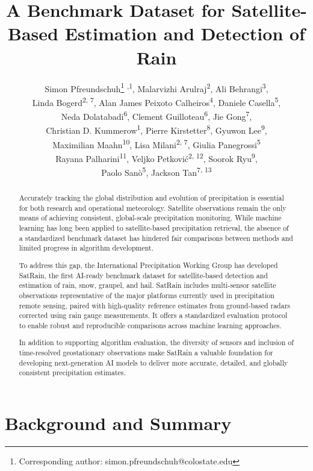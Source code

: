 \documentclass[11pt]{article}
\title{A Benchmark Dataset for Satellite-Based Estimation and Detection of Rain}
\author{%
	  Simon Pfreundschuh\thanks{Corresponding author: simon.pfreundschuh@colostate.edu} \textsuperscript{,1}, %
	Malarvizhi Arulraj\textsuperscript{2}, %
	Ali Behrangi\textsuperscript{3},\\ %
	Linda Bogerd\textsuperscript{2, 7},%
	Alan James Peixoto Calheiros\textsuperscript{4}, %
	Daniele Casella\textsuperscript{5},\\ %
	Neda Dolatabadi\textsuperscript{6}, %
	Clement Guilloteau\textsuperscript{6}, %
	Jie Gong\textsuperscript{7},\\ %
	Christian D. Kummerow\textsuperscript{1}, %
	Pierre Kirstetter\textsuperscript{8},  %
	Gyuwon Lee\textsuperscript{9},\\ %
	Maximilian Maahn\textsuperscript{10}, %
	Lisa Milani\textsuperscript{2, 7}, %
  Giulia Panegrossi\textsuperscript{5} \\ %
	Rayana Palharini\textsuperscript{11},%
	Veljko Petković\textsuperscript{2, 12}, %
	Soorok Ryu\textsuperscript{9},\\ %
	Paolo Sanò\textsuperscript{5}, %
	Jackson Tan\textsuperscript{7, 13}
}
\date{
  \begin{flushleft}
	\footnotesize
	\textsuperscript{1} Department of Atmospheric Science, Colorado State University \\
	\textsuperscript{2} Earth System Science Interdisciplinary Center, University of Maryland  \\
	\textsuperscript{3} Department of Hydrology and Atmospheric Sciences, University of Arizona\\
	\textsuperscript{4} Instituto Nacional de Pesquisas Espaciais \\
	\textsuperscript{5} Institute of Atmospheric Sciences and Climate, Italian National Research Council \\
	\textsuperscript{6} Department of Civil and Environmental Engineering, University of California Irvine \\
	\textsuperscript{7} NASA Goddard Space Flight Center \\
  \textsuperscript{8} School of Meteorology & School of Civil Engineering and Environmental Science, University of Oklahoma \\
	\textsuperscript{9} Department of Atmospheric Sciences, Kyungpook National University \\
	\textsuperscript{10} Institute for Meteorology, Leipzig University \\
  \textsuperscript{11} Departamento de Prevención de Riegos y Medio Ambiente, Universidad Tecnológica Metropolitana, \\
	\textsuperscript{12} Cooperative Institute for Satellite Earth System Studies, University of Maryland  \\
  \textsuperscript{13} University of Maryland, Baltimore County \\
	\end{flushleft}
}
\begin{document}
\maketitle


\begin{abstract}

	Accurately tracking the global distribution and evolution of precipitation is essential for both research and operational meteorology. Satellite observations remain the only means of achieving consistent, global-scale precipitation monitoring. While machine learning has long been applied to satellite-based precipitation retrieval, the absence of a standardized benchmark dataset has hindered fair comparisons between methods and limited progress in algorithm development.

	To address this gap, the International Precipitation Working Group has developed SatRain, the first AI-ready benchmark dataset for satellite-based detection and estimation of rain, snow, graupel, and hail. SatRain includes multi-sensor satellite observations representative of the major platforms currently used in precipitation remote sensing, paired with high-quality reference estimates from ground-based radars corrected using rain gauge measurements. It offers a standardized evaluation protocol to enable robust and reproducible comparisons across machine learning approaches.

	In addition to supporting algorithm evaluation, the diversity of sensors and inclusion of time-resolved geostationary observations make SatRain a valuable foundation for developing next-generation AI models to deliver more accurate, detailed, and globally consistent precipitation estimates.
\end{abstract}

\section{Background and Summary}
\end{document}
